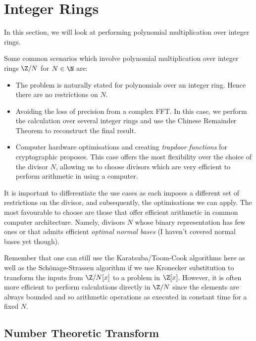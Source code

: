 \chapter{Integer Rings}\label{chp:integer-rings}

In this section, we will look at performing polynomial multiplication over integer rings.

Some common scenarios which involve polynomial multiplication over integer rings $\Z/N$ for $N \in \N$ are:
\begin{itemize}
    \item The problem is naturally stated for polynomials over an integer ring. Hence there are no restrictions on $N$.
    \item Avoiding the loss of precision from a complex FFT. In this case, we perform the calculation over several integer rings and use the Chinese Remainder Theorem to reconstruct the final result.
    \item Computer hardware optimisations and creating \emph{trapdoor functions} for cryptographic proposes. This case offers the most flexibility over the choice of the divisor $N$, allowing us to choose divisors which are very efficient to perform arithmetic in using a computer.
\end{itemize}

It is important to differentiate the use cases as each imposes a different set of restrictions on the divisor, and subsequently, the optimisations we can apply. The most favourable to choose are those that offer efficient arithmetic in common computer architecture. Namely, divisors $N$ whose binary representation has few ones or that admits efficient \emph{optimal normal bases} (I haven't covered normal bases yet though).

Remember that one can still use the Karatsuba/Toom-Cook algorithms here as well as the Sch\"{o}nage-Strassen algorithm if we use Kronecker substitution to transform the inputs from $\Z/N[x]$ to a problem in $\Z[x]$. However, it is often more efficient to perform calculations directly in $\Z/N$ since the elements are always bounded and so arithmetic operations as executed in constant time for a fixed $N$.


\section{Number Theoretic Transform}
\label{sec:ntt}


